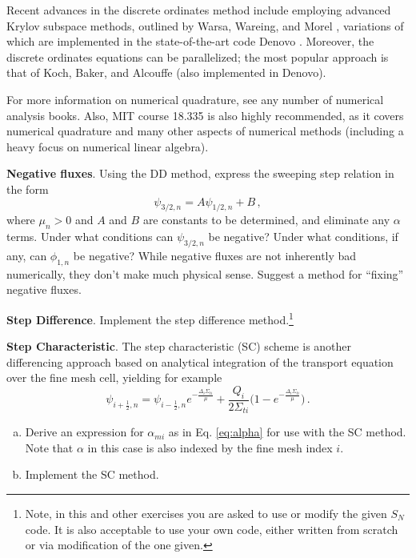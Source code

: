 Recent advances in the discrete ordinates method include employing advanced Krylov subspace methods, outlined by Warsa, Wareing, and Morel \cite{warsa2004kim}, variations of which are implemented in the state-of-the-art code Denovo \cite{evans2010dnt}.  Moreover, the discrete ordinates equations can be parallelized; the most popular approach is that of Koch, Baker, and Alcouffe \cite{koch1992sfo} (also implemented in Denovo).

For more information on numerical quadrature, see any number of numerical analysis books.  Also, MIT course 18.335 is also highly recommended, as it covers numerical quadrature and many other aspects of numerical methods (including a heavy focus on numerical linear algebra).

\begin{exercises}

  \item \textbf{Negative fluxes}. Using the DD method, express the sweeping step relation in the form
  \begin{equation*}
    \psi_{3/2,n} = A \psi_{1/2,n} + B \, ,
  \end{equation*}
  where $\mu_n > 0$ and $A$ and $B$ are constants to be determined, and eliminate any $\alpha$ terms.  Under what conditions can $\psi_{3/2,n}$ be negative?  Under what conditions, if any, can $\phi_{1,n}$ be negative?  While negative fluxes are not inherently bad numerically, they don't make much physical sense.  Suggest a method for ``fixing'' negative fluxes.

  \item \textbf{Step Difference}.  Implement the step difference method.\footnote{Note, in this and other exercises you are asked to use or modify the given $S_N$ code.  It is also acceptable to use your own code, either written from scratch or via modification of the one given.}

  \item \textbf{Step Characteristic}.  The step characteristic (SC) scheme is another differencing approach based on analytical integration of the transport equation over the fine mesh cell, yielding for example
  \begin{equation*}
    \psi_{i+\frac{1}{2},n}  =  \psi_{i-\frac{1}{2},n} e^{- \frac{\Delta_i \Sigma_{ti}}{\mu}} + \frac{Q_i}{2\Sigma_{ti}} \Big ( 1-e^{-\frac{\Delta_i \Sigma_{ti}}{\mu}} \Big ) \, .
  \end{equation*}
  \begin{enumerate}[(a)]
    \item Derive an expression for $\alpha_{mi}$ as in Eq. \ref{eq:alpha} for use with the SC method.  Note that $\alpha$ in this case is also indexed by the fine mesh index $i$. 
    \item Implement the SC method.
  \end{enumerate}
 

\end{exercises}
